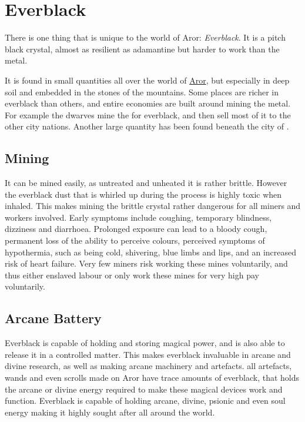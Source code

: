 \ifimages
\clearpage
{}
\clearpage
\fi

\section{Everblack}
\label{sec:Everblack}

There is one thing that is unique to the world of Aror: \emph{Everblack}. It is
a pitch black crystal, almost as resilient as adamantine but harder to work
than the metal.

It is found in small quantities all over the world of \hyperref[sec:Aror]{Aror},
but especially in deep soil and embedded in the stones of the mountains. Some
places are richer in everblack than others, and entire economies are built
around mining the metal. For example the dwarves  mine the
 for everblack, and then sell most of it to the
other city nations. Another large quantity has been found beneath the city of
.

\subsection{Mining}

It can be mined easily, as untreated and unheated it is rather brittle. However
the everblack dust that is whirled up during the process is highly toxic when
inhaled. This makes mining the brittle crystal rather dangerous for all miners
and workers involved. Early symptoms include coughing, temporary blindness,
dizziness and diarrhoea. Prolonged exposure can lead to a bloody cough,
permanent loss of the ability to perceive colours, perceived symptoms of
hypothermia, such as being cold, shivering, blue limbs and lips, and an
increased risk of heart failure. Very few miners risk working these mines
voluntarily, and thus either enslaved labour or only work these mines for very
high pay voluntarily.

\subsection{Arcane Battery}

Everblack is capable of holding and storing magical power, and is also able to
release it in a controlled matter. This makes everblack invaluable in arcane
and divine research, as well as making arcane machinery and artefacts. all
artefacts, wands and even scrolls made on Aror have trace amounts of
everblack, that holds the arcane or divine energy required to make these
magical devices work and function. Everblack is capable of holding arcane,
divine, psionic and even soul energy making it highly sought after all around
the world.

